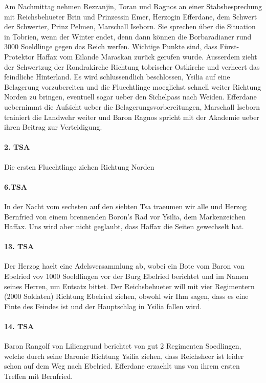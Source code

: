 Am Nachmittag nehmen Rezzanjin, Toran und Ragnos an einer Stabsbesprechung mit Reichsbehueter Brin und Prinzessin Emer, Herzogin Efferdane, dem Schwert der Schwerter, Prinz Pelmen, Marschall Iseborn. Sie sprechen über die Situation in Tobrien, wenn der Winter endet, denn dann können die Borbaradianer rund 3000 Soeldlinge gegen das Reich werfen. Wichtige Punkte sind, dass Fürst-Protektor Haffax vom Eilande Maraskan zurück gerufen wurde. Ausserdem zieht der Schwertzug der Rondrakirche Richtung tobrischer Ostkirche und verheert das feindliche Hinterland. Es wird schlussendlich beschlossen, Ysilia auf eine Belagerung vorzubereiten und die Fluechtlinge moeglichst schnell weiter Richtung Norden zu bringen, eventuell sogar ueber den Sichelpass nach Weiden. Efferdane uebernimmt die Aufsicht ueber die Belagerungsvorbereitungen, Marschall Iseborn trainiert die Landwehr weiter und Baron Ragnos spricht mit der Akademie ueber ihren Beitrag zur Verteidigung.

\paragraph{2. TSA}
Die ersten Fluechtlinge ziehen Richtung Norden

\paragraph{6.TSA}
In der Nacht vom sechsten auf den siebten Tsa traeumen wir alle und Herzog Bernfried von einem brennenden Boron's Rad vor Ysilia, dem Markenzeichen Haffax. Uns wird aber nicht geglaubt, dass Haffax die Seiten gewechselt hat.

\paragraph{13. TSA}
Der Herzog haelt eine Adelsversammlung ab, wobei ein Bote vom Baron von Ebelried vov 1000 Soeldlingen vor der Burg Ebelried berichtet und im Namen seines Herren, um Entsatz bittet. Der Reichsbehueter will mit vier Regimentern (2000 Soldaten) Richtung Ebelried ziehen, obwohl wir Ihm sagen, dass es eine Finte des Feindes ist und der Hauptschlag in Ysilia fallen wird.

\paragraph{14. TSA}
Baron Rangolf von Liliengrund berichtet von gut 2 Regimenten Soedlingen, welche durch seine Baronie Richtung Ysilia ziehen, dass Reichsheer ist leider schon auf dem Weg nach Ebelried.
Efferdane erzaehlt uns von ihrem ersten Treffen mit Bernfried.

